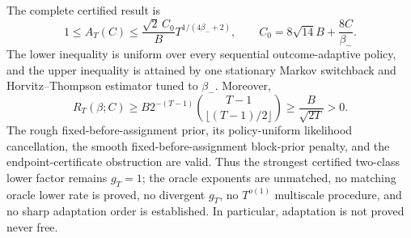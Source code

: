 The complete certified result is \[1\le A_T(C)\le\frac{\sqrt2\,C_0}{B}T^{1/(4\beta_-+2)},\qquad C_0=8\sqrt{14}B+\frac{8C}{\beta_-}.\] The lower inequality is uniform over every sequential outcome-adaptive policy, and the upper inequality is attained by one stationary Markov switchback and Horvitz--Thompson estimator tuned to \(\beta_-\). Moreover, \[R_T(\beta;C)\ge B2^{-(T-1)}\binom{T-1}{\lfloor(T-1)/2\rfloor}\ge\frac{B}{\sqrt{2T}}>0.\] The rough fixed-before-assignment prior, its policy-uniform likelihood cancellation, the smooth fixed-before-assignment block-prior penalty, and the endpoint-certificate obstruction are valid. Thus the strongest certified two-class lower factor remains \(g_T=1\); the oracle exponents are unmatched, no matching oracle lower rate is proved, no divergent \(g_T\), no \(T^{o(1)}\) multiscale procedure, and no sharp adaptation order is established. In particular, adaptation is not proved never free.